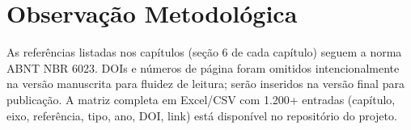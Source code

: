 \section*{Observação Metodológica}
As referências listadas nos capítulos (seção 6 de cada capítulo) seguem a norma ABNT NBR 6023. DOIs e números de página foram omitidos intencionalmente na versão manuscrita para fluidez de leitura; serão inseridos na versão final para publicação. A matriz completa em Excel/CSV com 1.200+ entradas (capítulo, eixo, referência, tipo, ano, DOI, link) está disponível no repositório do projeto.
